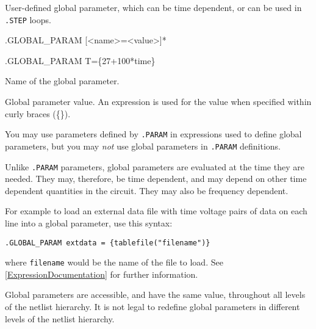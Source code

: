 


User-defined global parameter, which can be time dependent, or can be used in \texttt{.STEP} loops.

\begin{Command}

\format
.GLOBAL\_PARAM [<name>=<value>]*

\examples
.GLOBAL\_PARAM T=\{27+100*time\}

\begin{Arguments}
Name of the global parameter.

Global parameter value.  An expression is used for the value when specified within curly braces (\{\}).

\end{Arguments}

\comments

You may use parameters defined by \texttt{.PARAM} in expressions used to
define global parameters, but you may {\em not} use global parameters in
\texttt{.PARAM} definitions.

Unlike \texttt{.PARAM} parameters, global parameters are evaluated at
the time they are needed. They may, therefore, be time dependent, and may
depend on other time dependent quantities in the circuit.  They may also
be frequency dependent.

For example to load an external data file with time voltage pairs of data on each 
line into a global parameter, use this syntax:

\texttt{.GLOBAL\_PARAM extdata = \{tablefile("filename")\}}

where \texttt{filename} would be the name of the file to load.  See \ref{ExpressionDocumentation} for 
further information.

Global parameters are accessible, and have the same value, throughout all
levels of the netlist hierarchy.  It is not legal to redefine global parameters
in different levels of the netlist hierarchy.

\end{Command}
